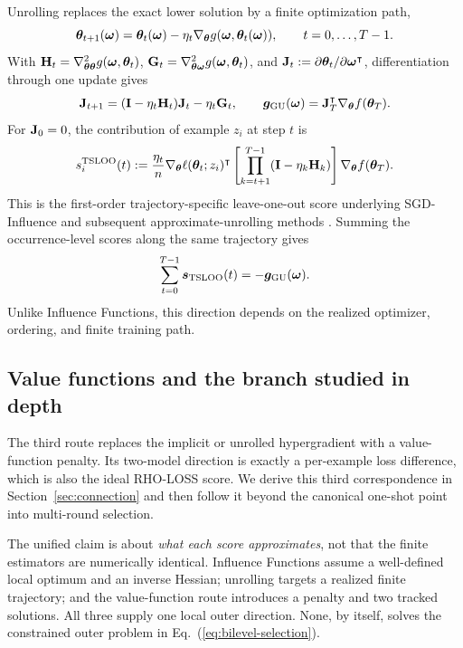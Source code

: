 Unrolling replaces the exact lower solution by a finite optimization path,
\begin{equation}
{\bm{\theta}}_{t+1}({\bm{\omega}})={\bm{\theta}}_t({\bm{\omega}})
-\eta_t\nabla_{{\bm{\theta}}}g({\bm{\omega}},{\bm{\theta}}_t({\bm{\omega}})),
\qquad t=0,\ldots,T-1.
\label{eq:unrolled-training}
\end{equation}
With ${\mathbf{H}}_t=\nabla^2_{{\bm{\theta}}{\bm{\theta}}}g({\bm{\omega}},{\bm{\theta}}_t)$,
${\mathbf{G}}_t=\nabla^2_{{\bm{\theta}}{\bm{\omega}}}g({\bm{\omega}},{\bm{\theta}}_t)$, and
${\mathbf{J}}_t:=\partial{\bm{\theta}}_t/\partial{\bm{\omega}}^\intercal$, differentiation through
one update gives
\begin{equation}
{\mathbf{J}}_{t+1}=({\mathbf{I}}-\eta_t{\mathbf{H}}_t){\mathbf{J}}_t-\eta_t{\mathbf{G}}_t,
\qquad
{\bm{g}}_{\mathrm{GU}}({\bm{\omega}})={\mathbf{J}}_T^\intercal
\nabla_{{\bm{\theta}}}f({\bm{\theta}}_T).
\label{eq:gu-recurrence}
\end{equation}
For ${\mathbf{J}}_0=0$, the contribution of example $z_i$ at step $t$ is
\begin{equation}
s_i^{\mathrm{TSLOO}}(t)
:=\frac{\eta_t}{n}\nabla_{{\bm{\theta}}}\ell({\bm{\theta}}_t;z_i)^\intercal
\left[\prod_{k=t+1}^{T-1}({\mathbf{I}}-\eta_k{\mathbf{H}}_k)\right]
\nabla_{{\bm{\theta}}}f({\bm{\theta}}_T).
\label{eq:tsloo-score}
\end{equation}
This is the first-order trajectory-specific leave-one-out score underlying
SGD-Influence \citep{hara2019sgdinfluence} and subsequent approximate-unrolling
methods \citep{bae2024source,wang2024temporal}. Summing the occurrence-level
scores along the same trajectory gives
\begin{equation}
\sum_{t=0}^{T-1}\bm{s}_{\mathrm{TSLOO}}(t)
=-{\bm{g}}_{\mathrm{GU}}({\bm{\omega}}).
\label{eq:tsloo-gu-correspondence}
\end{equation}
Unlike Influence Functions, this direction depends on the realized optimizer,
ordering, and finite training path.

\subsection{Value functions and the branch studied in depth}

The third route replaces the implicit or unrolled hypergradient with a
value-function penalty. Its two-model direction is exactly a per-example loss
difference, which is also the ideal RHO-LOSS score. We derive this third
correspondence in Section~\ref{sec:connection} and then follow it beyond the
canonical one-shot point into multi-round selection.

The unified claim is about \emph{what each score approximates}, not that the
finite estimators are numerically identical. Influence Functions assume a
well-defined local optimum and an inverse Hessian; unrolling targets a realized
finite trajectory; and the value-function route introduces a penalty and two
tracked solutions. All three supply one local outer direction. None, by itself,
solves the constrained outer problem in Eq.~(\ref{eq:bilevel-selection}).

